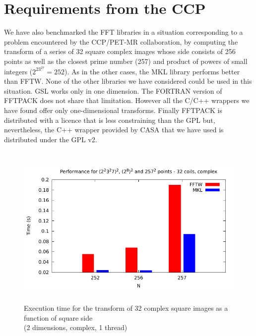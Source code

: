 \documentclass[12pt, a4paper]{article}
\begin{document}
\section{Requirements from the CCP}
We have also benchmarked the FFT libraries in a situation corresponding to a problem encountered by the CCP/PET-MR collaboration, by computing the transform of a series of 32 square complex images whose side consists of 256 points as well as the closest prime number (257) and product of powers of small integers ($2^23^27=252$). As in the other cases, the MKL library performs better than FFTW. None of the other libraries we have considered could be used in this situation. GSL works only in one dimension. The FORTRAN version of FFTPACK does not share that limitation. However all the C/C++ wrappers we have found offer only one-dimensional transforms. Finally FFTPACK is distributed with a licence that is less constraining than the GPL but, nevertheless, the C++ wrapper provided by CASA that we have used is distributed under the GPL v2.

\begin{figure}[H]
\captionsetup{width=0.6\textwidth}
\centering
\includegraphics[height=8cm]{graphs/ccp/ccp.pdf}
\caption{Execution time for the transform of 32 complex square images as a function of square side\\(2 dimensions, complex, 1 thread)}
\label{method}
\end{figure}
\end{document}
